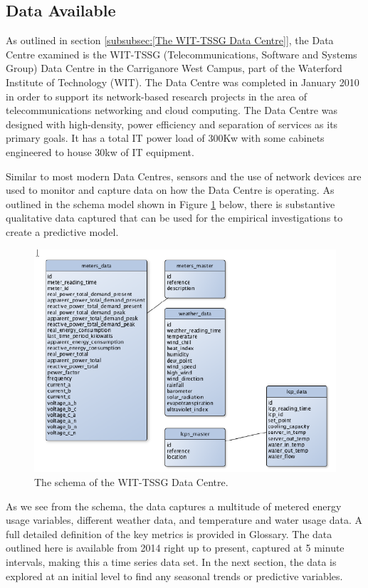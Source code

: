 \documentclass[12pt]{scrartcl}
\begin{document}
\subsection{Data Available}
\label{subsec:[Data Available]}
As outlined in section \ref{subsubsec:[The WIT-TSSG Data Centre]}, the Data Centre examined is the WIT-TSSG (Telecommunications, Software and Systems Group) Data Centre in the Carriganore West Campus, part of the Waterford Institute of Technology (WIT). The Data Centre was completed in January 2010 in order to support its network-based research projects in the area of telecommunications networking and cloud computing. The Data Centre was designed with high-density, power efficiency and separation of services as its primary goals. It has a total IT power load of 300Kw with some cabinets engineered to house 30kw of IT equipment.

Similar to most modern Data Centres, sensors and the use of network devices are used to monitor and capture data on how the Data Centre is operating. As outlined in the schema model shown in Figure \ref{fig:TSSGdataschema} below, there is substantive qualitative data captured that can be used for the empirical investigations to create a predictive model.  

\begin{figure}[h]
  \caption{The schema of the WIT-TSSG Data Centre.}
  \label{fig:TSSGdataschema}
  \centering
    \includegraphics[scale=0.45]{TSSG_Data_Schema}
\end{figure}

As we see from the schema, the data captures a multitude of metered energy usage variables, different weather data, and temperature and water usage data. A full detailed definition of the key metrics is provided in Glossary. The data outlined here is available from 2014 right up to present, captured at 5 minute intervals, making this a time series data set. In the next section, the data is explored at an initial level to find any seasonal trends or predictive variables. 
 
\end{document}
